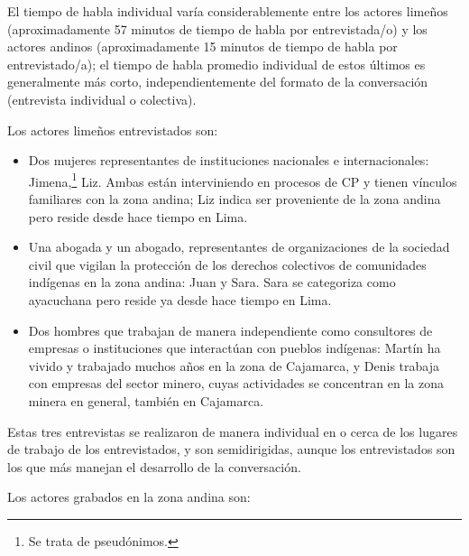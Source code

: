 \documentclass[output=paper]{../langscibook}
\begin{document}
El tiempo de habla individual varía considerablemente entre los actores limeños (aproximadamente 57 minutos de tiempo de habla por entrevistada/o) y los actores andinos (aproximadamente 15 minutos de tiempo de habla por entrevistado/a); el tiempo de habla promedio individual de estos últimos es generalmente más corto, independientemente del formato de la conversación (entrevista individual o colectiva). 

Los actores limeños entrevistados son:

\begin{itemize}
\item Dos mujeres representantes de instituciones nacionales e internacionales: Jimena,\footnote{Se trata de pseudónimos.} Liz. Ambas están interviniendo en procesos de CP y tienen vínculos familiares con la zona andina; Liz indica ser proveniente de la zona andina pero reside desde hace tiempo en Lima.
\item Una abogada y un abogado, representantes de organizaciones de la sociedad civil que vigilan la protección de los derechos colectivos de comunidades indígenas en la zona andina: Juan y Sara. Sara se categoriza como ayacuchana pero reside ya desde hace tiempo en Lima.
\item Dos hombres que trabajan de manera independiente como consultores de empresas o instituciones que interactúan con pueblos indígenas: Martín ha vivido y trabajado muchos años en la zona de Cajamarca, y Denis trabaja con empresas del sector minero, cuyas actividades se concentran en la zona minera en general, también en Cajamarca.
\end{itemize}

Estas tres entrevistas se realizaron de manera individual en o cerca de los lugares de trabajo de los entrevistados, y son semidirigidas, aunque los entrevistados son los que más manejan el desarrollo de la conversación.

Los actores grabados en la zona andina son: 
\end{document}
